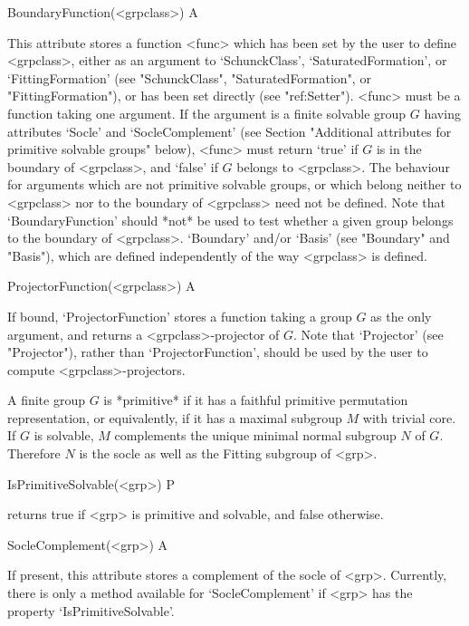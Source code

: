 \>BoundaryFunction(<grpclass>)                                  A

This attribute stores a function <func> which has been set by the 
user to define <grpclass>, either as an argument to `SchunckClass', 
`SaturatedFormation', or `FittingFormation' (see "SchunckClass", 
"SaturatedFormation", or "FittingFormation"), or has been set directly
(see "ref:Setter"). <func> must be a function taking one argument.
If the argument is a finite solvable group $G$ having attributes 
`Socle' and `SocleComplement' (see Section "Additional attributes for 
primitive solvable groups" below), <func> must  return `true' if $G$ 
is in the boundary of <grpclass>, and `false' if $G$ belongs to 
<grpclass>. The behaviour for arguments which are not primitive 
solvable groups, or which  belong neither to <grpclass> nor to the 
boundary of <grpclass> need not be defined. Note that 
`BoundaryFunction' should *not* be used to test whether a given group 
belongs to the boundary of <grpclass>. `Boundary' and/or `Basis' (see 
"Boundary" and "Basis"), which are defined independently of the way 
<grpclass> is defined.


\>ProjectorFunction(<grpclass>) A

If bound, `ProjectorFunction' stores a function taking a group $G$ as the
only argument, and returns a <grpclass>-projector of $G$.  Note that `Projector'
(see "Projector"),
rather than `ProjectorFunction', should be used by the user to compute
<grpclass>-projectors.


\null


A finite group $G$ is *primitive* if it has a faithful primitive permutation 
representation, or equivalently, if it has a maximal subgroup $M$ with trivial 
core. If $G$ is solvable, $M$ complements the unique minimal normal subgroup
$N$ of $G$. Therefore $N$ is the socle as well as the Fitting subgroup of
<grp>.


\>IsPrimitiveSolvable(<grp>) P

returns true if <grp> is primitive and solvable, and false otherwise.


\>SocleComplement(<grp>) A

If present, this attribute stores a complement of the socle of <grp>.
Currently, there is only a method available for `SocleComplement'
if <grp> has the property `IsPrimitiveSolvable'.


